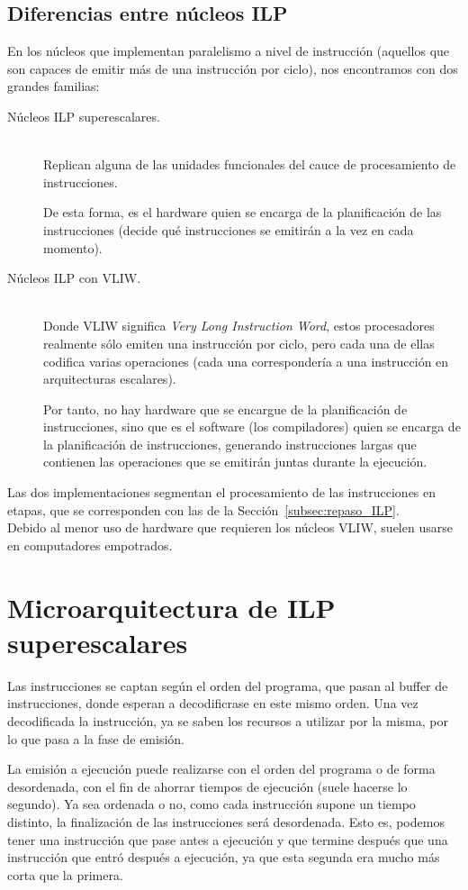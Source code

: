 \subsection{Diferencias entre núcleos ILP}\label{sec:diff_ilp}
En los núcleos que implementan paralelismo a nivel de instrucción (aquellos que son capaces de emitir más de una instrucción por ciclo), nos encontramos con dos grandes familias:
\begin{description}
    \item [Núcleos ILP superescalares.]~\\
        Replican alguna de las unidades funcionales del cauce de procesamiento de instrucciones. 

        De esta forma, es el hardware quien se encarga de la planificación de las instrucciones (decide qué instrucciones se emitirán a la vez en cada momento).
    \item [Núcleos ILP con VLIW.]~\\
        Donde VLIW significa \emph{Very Long Instruction Word}, estos procesadores realmente sólo emiten una instrucción por ciclo, pero cada una de ellas codifica varias operaciones (cada una correspondería a una instrucción en arquitecturas escalares). 

        Por tanto, no hay hardware que se encargue de la planificación de instrucciones, sino que es el software (los compiladores) quien se encarga de la planificación de instrucciones, generando instrucciones largas que contienen las operaciones que se emitirán juntas durante la ejecución.
\end{description}
Las dos implementaciones segmentan el procesamiento de las instrucciones en etapas, que se corresponden con las de la Sección~\ref{subsec:repaso_ILP}.\\

Debido al menor uso de hardware que requieren los núcleos VLIW, suelen usarse en computadores empotrados.\\

\section{Microarquitectura de ILP superescalares}
Las instrucciones se captan según el orden del programa, que pasan al buffer de instrucciones, donde esperan a decodificrase en este mismo orden. Una vez decodificada la instrucción, ya se saben los recursos a utilizar por la misma, por lo que pasa a la fase de emisión.

La emisión a ejecución puede realizarse con el orden del programa o de forma desordenada, con el fin de ahorrar tiempos de ejecución (suele hacerse lo segundo). Ya sea ordenada o no, como cada instrucción supone un tiempo distinto, la finalización de las instrucciones será desordenada. Esto es, podemos tener una instrucción que pase antes a ejecución y que termine después que una instrucción que entró después a ejecución, ya que esta segunda era mucho más corta que la primera.\\

